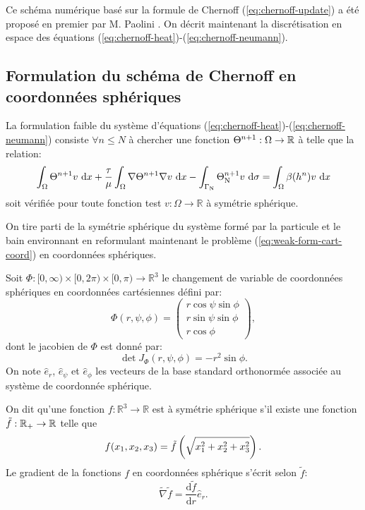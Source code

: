Ce schéma numérique basé sur la formule de Chernoff
(\ref{eq:chernoff-update}) a été proposé en premier par M. Paolini
\cite{Paolini1988}. On décrit maintenant la discrétisation en
espace des équations (\ref{eq:chernoff-heat})-(\ref{eq:chernoff-neumann}).


\subsection*{Formulation du schéma de Chernoff en coordonnées sphériques}
La formulation faible du système d'équations
(\ref{eq:chernoff-heat})-(\ref{eq:chernoff-neumann}) consiste $\forall
n\leq N$ à chercher une fonction $\Theta^{n+1}:\Omega\to\mathbb R$
à telle que la relation:
\begin{equation}\label{eq:weak-form-cart-coord}
  \int_\Omega \temperature^{n+1} v\,\intd{x} + \frac{\tau}{\mu} %
  \int_\Omega \nabla \temperature^{n+1} \nabla v\,\intd{x} - %
  \int_{\Gamma_\mathrm{N}} \temperature^{n+1}_\mathrm{N} v\,\intd{\sigma} %
  = \int_\Omega \beta(\enthalpydensity^n)v\,\intd{x}
\end{equation}
soit vérifiée pour toute fonction test $v:\Omega\to\mathbb R$ à
symétrie sphérique.

On tire parti de la symétrie sphérique du système formé par la
particule et le bain environnant en reformulant maintenant le
problème (\ref{eq:weak-form-cart-coord}) en coordonnées sphériques.

Soit $\Phi:[0,\infty)\times[0,2\pi)\times[0,\pi)\to\mathbb R^3$ le
changement de variable de coordonnées sphériques en coordonnées
cartésiennes défini par:
\begin{equation}
  \Phi(r, \psi, \phi) = \begin{pmatrix}
    r\cos\psi\sin\phi\\
    r\sin\psi\sin\phi\\
    r\cos\phi
  \end{pmatrix},
\end{equation}
dont le jacobien de $\Phi$ est donné par:
\begin{equation}\label{eq:spherical-jacobian}
  \det J_\Phi(r, \psi,\phi) = -r^2\sin\phi.
\end{equation}
On note $\hat e_r$, $\hat e_\psi$ et $\hat e_\phi$ les vecteurs de la
base standard orthonormée associée au système de coordonnée sphérique.

On dit qu'une fonction $f:\mathbb R^3\to\mathbb R$ est à symétrie
sphérique s'il existe une fonction $\tilde f:\mathbb
{\mathbb R_+}\to\mathbb R$ telle que
\begin{equation}\label{eq:spherical-symmetry}
  f(x_1, x_2, x_3) = \tilde f\left( \sqrt{x_1^2 + x_2^2 + x_3^2} \right).
\end{equation}
Le gradient de la fonctions $f$ en coordonnées sphérique s'écrit selon
$\tilde f$:
\begin{equation}\label{eq:spherical-gradient}
  \tilde\nabla\tilde f = \frac{\mathrm d\tilde f}{\mathrm dr}\hat e_r.
\end{equation}

